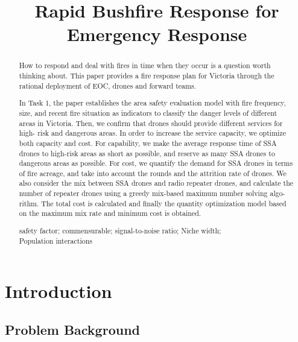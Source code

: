 \documentclass{mcmthesis}
\title{\textbf{\Large{Rapid Bushfire Response for Emergency Response}}}
\begin{document}
\begin{abstract}
	\qquad How to respond and deal with fires in time when they occur is a question worth
	thinking about. This paper provides a fire response plan for Victoria through the rational deployment of EOC, drones and forward teams.

	In Task 1, the paper establishes the area safety evaluation model with fire frequency,
	size, and recent fire situation as indicators to classify the danger levels of different areas
	in Victoria. Then, we confirm that drones should provide different services for high-
	risk and dangerous areas. In order to increase the service capacity, we optimize both
	capacity and cost. For capability, we make the average response time of SSA drones
	to high-risk areas as short as possible, and reserve as many SSA drones to dangerous
	areas as possible. For cost, we quantify the demand for SSA drones in terms of fire
	acreage, and take into account the rounds and the attrition rate of drones. We also
	consider the mix between SSA drones and radio repeater drones, and calculate the
	number of repeater drones using a greedy mix-based maximum number solving algo-
	rithm. The total cost is calculated and finally the quantity optimization model based on
	the maximum mix rate and minimum cost is obtained.
	\begin{keywords}
		safety factor; commensurable; signal-to-noise ratio; Niche width;\\Population interactions
	\end{keywords}
\end{abstract}
\maketitle

\clearpage
\pagestyle{fancy}
\newpage
\setcounter{page}{1}
\newpage
\tableofcontents
\thispagestyle{empty}
\newpage

\section{Introduction}
\subsection{Problem Background}
\end{document}
